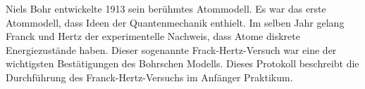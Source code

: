 Niels Bohr entwickelte 1913 sein berühmtes Atommodell. Es war das erste Atommodell, dass Ideen der Quantenmechanik enthielt. Im selben Jahr gelang Franck und Hertz der experimentelle Nachweis, dass Atome diskrete Energiezustände haben. Dieser sogenannte Frack-Hertz-Versuch war eine der wichtigsten Bestätigungen des Bohrschen Modells. Dieses Protokoll beschreibt die Durchführung des Franck-Hertz-Versuchs im Anfänger Praktikum. \cite[Kap. 13.4 und 14.4.1]{Walcher}